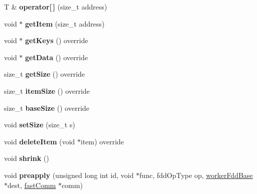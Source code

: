 \begin{DoxyCompactItemize}
\item 
\hypertarget{classfaster_1_1workerFddCore_ad93c9c3c5836ab3bf5a8bc425d976211}{}T \& {\bfseries operator\mbox{[}$\,$\mbox{]}} (size\+\_\+t address)\label{classfaster_1_1workerFddCore_ad93c9c3c5836ab3bf5a8bc425d976211}

\item 
\hypertarget{classfaster_1_1workerFddCore_a7753b4b41fa7c87676f7a6ef75a125cb}{}void $\ast$ {\bfseries get\+Item} (size\+\_\+t address)\label{classfaster_1_1workerFddCore_a7753b4b41fa7c87676f7a6ef75a125cb}

\item 
\hypertarget{classfaster_1_1workerFddCore_ae3768cc9c330c25c669611b5df3c5454}{}void $\ast$ {\bfseries get\+Keys} () override\label{classfaster_1_1workerFddCore_ae3768cc9c330c25c669611b5df3c5454}

\item 
\hypertarget{classfaster_1_1workerFddCore_a77172c15f3409bbe233be13aabfe8071}{}void $\ast$ {\bfseries get\+Data} () override\label{classfaster_1_1workerFddCore_a77172c15f3409bbe233be13aabfe8071}

\item 
\hypertarget{classfaster_1_1workerFddCore_a32bd4aca33e352d018a3bde34e7104d2}{}size\+\_\+t {\bfseries get\+Size} () override\label{classfaster_1_1workerFddCore_a32bd4aca33e352d018a3bde34e7104d2}

\item 
\hypertarget{classfaster_1_1workerFddCore_a68f16ce63e3bda36270a9f096e7bf007}{}size\+\_\+t {\bfseries item\+Size} () override\label{classfaster_1_1workerFddCore_a68f16ce63e3bda36270a9f096e7bf007}

\item 
\hypertarget{classfaster_1_1workerFddCore_aa56e4f3c789781c5e5745cb1a9f55032}{}size\+\_\+t {\bfseries base\+Size} () override\label{classfaster_1_1workerFddCore_aa56e4f3c789781c5e5745cb1a9f55032}

\item 
\hypertarget{classfaster_1_1workerFddCore_ae6834075d00c10b68b4ed8dc56a43ff1}{}void {\bfseries set\+Size} (size\+\_\+t s)\label{classfaster_1_1workerFddCore_ae6834075d00c10b68b4ed8dc56a43ff1}

\item 
\hypertarget{classfaster_1_1workerFddCore_aece15833d979a1315018b17426f9f943}{}void {\bfseries delete\+Item} (void $\ast$item) override\label{classfaster_1_1workerFddCore_aece15833d979a1315018b17426f9f943}

\item 
\hypertarget{classfaster_1_1workerFddCore_a9e9247a366e0a1e1b60c759ff9badb5c}{}void {\bfseries shrink} ()\label{classfaster_1_1workerFddCore_a9e9247a366e0a1e1b60c759ff9badb5c}

\item 
\hypertarget{classfaster_1_1workerFddCore_a4533454652b609e0cedb026ad1d3e881}{}void {\bfseries preapply} (unsigned long int id, void $\ast$func, fdd\+Op\+Type op, \hyperlink{classfaster_1_1workerFddBase}{worker\+Fdd\+Base} $\ast$dest, \hyperlink{classfaster_1_1fastComm}{fast\+Comm} $\ast$comm)\label{classfaster_1_1workerFddCore_a4533454652b609e0cedb026ad1d3e881}

\end{DoxyCompactItemize}
